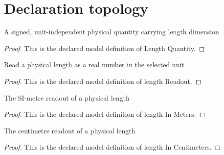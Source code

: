 \section{Declaration topology}
\begin{definition}
  \label{def:physics:phyx-mini-0122:phyxminiproblems-problemphyxmini0122-lengthquantity}
  A signed, unit-independent physical quantity carrying length dimension
\end{definition}
\begin{proof}
  This is the declared model definition of Length Quantity.
\end{proof}
\begin{definition}
  \label{def:physics:phyx-mini-0122:phyxminiproblems-problemphyxmini0122-lengthreadout}
  Read a physical length as a real number in the selected unit
\end{definition}
\begin{proof}
  This is the declared model definition of length Readout.
\end{proof}
\begin{definition}
  \label{def:physics:phyx-mini-0122:phyxminiproblems-problemphyxmini0122-lengthinmeters}
  The SI-metre readout of a physical length
\end{definition}
\begin{proof}
  This is the declared model definition of length In Meters.
\end{proof}
\begin{definition}
  \label{def:physics:phyx-mini-0122:phyxminiproblems-problemphyxmini0122-lengthincentimeters}
  The centimetre readout of a physical length
\end{definition}
\begin{proof}
  This is the declared model definition of length In Centimeters.
\end{proof}
